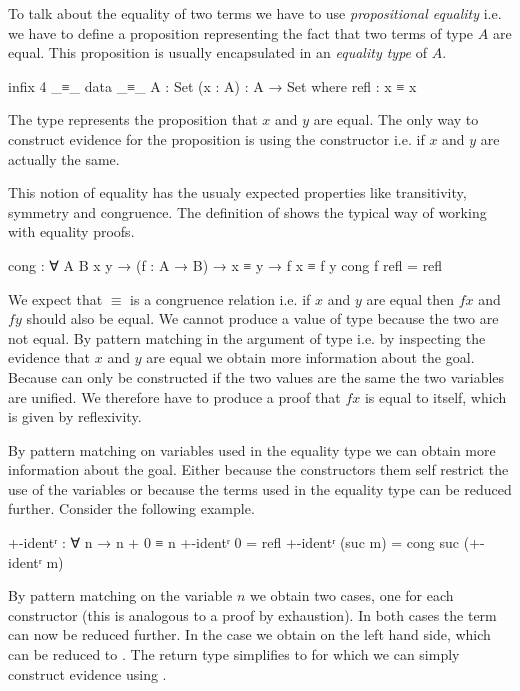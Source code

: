 \documentclass[10pt,a4paper,twoside]{report}
\begin{document}
To talk about the equality of two terms we have to use \textit{propositional
equality} i.e. we have to define a proposition representing the fact that two
terms of type $A$ are equal.
This proposition is usually encapsulated in an \textit{equality type} of $A$.

\begin{code}
infix 4 _≡_
data _≡_ {A : Set} (x : A) : A → Set where
  refl : x ≡ x
\end{code}
The type
\AgdaSpace{}\AgdaSpace{}
represents the proposition that $x$ and $y$ are equal.
The only way to construct evidence for the proposition is using the
 constructor i.e. if $x$ and $y$ are actually the
same.

This notion of equality has the usualy expected properties like transitivity,
symmetry and congruence.
The definition of  shows the typical way of working with
equality proofs.

\begin{code}
cong : ∀ {A B x y} → (f : A → B) → x ≡ y → f x ≡ f y
cong f refl = refl
\end{code}
We expect that $≡$ is a congruence relation i.e. if $x$ and $y$ are equal then
$f x$ and $f y$ should also be equal.
We cannot produce a value of type
\AgdaSpace{}\AgdaSpace{}\AgdaSpace{}\AgdaSpace{}
because the two are not equal.
By pattern matching in the argument of type 
\AgdaSpace{}\AgdaSpace{}
i.e. by inspecting the evidence that $x$ and $y$ are equal we obtain more
information about the goal.
Because  can only be constructed if the two
values are the same the two variables are unified.
We therefore have to produce a proof that $f x$ is equal to itself, which is
given by reflexivity.

By pattern matching on variables used in the equality type we can obtain more
information about the goal.
Either because the constructors them self restrict the use of the variables or
because the terms used in the equality type can be reduced further.
Consider the following example.

\begin{code}
+-identʳ : ∀ n → n + 0 ≡ n
+-identʳ 0        = refl
+-identʳ (suc m)  = cong suc (+-identʳ m)
\end{code}
By pattern matching on the variable $n$ we obtain two cases, one for each
constructor (this is analogous to a proof by exhaustion).
In both cases the term
\AgdaSpace{}\AgdaFunction{}\AgdaSpace{}
can now be reduced further.
In the  case we obtain
\AgdaSpace{}\AgdaFunction{+}\AgdaSpace{}
on the left hand side, which can be reduced to .
The return type simplifies to 
\AgdaSpace{}\AgdaSpace{}
for which we can simply construct evidence using
.
\end{document}
